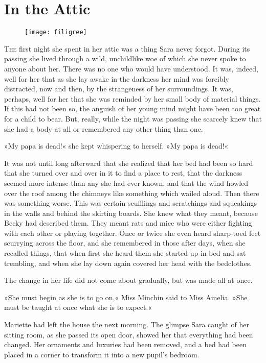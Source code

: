 \chapter{In the Attic}

\begin{figure}[t!]
\centering
\texttt{[image: filigree]}
\end{figure}

\lettrine[lines=5]{T}{he} first night she spent in her attic was a thing Sara never forgot. During its passing she lived through a wild, unchildlike woe of which she never spoke to anyone about her. There was no one who would have understood. It was, indeed, well for her that as she lay awake in the darkness her mind was forcibly distracted, now and then, by the strangeness of her surroundings. It was, perhaps, well for her that she was reminded by her small body of material things. If this had not been so, the anguish of her young mind might have been too great for a child to bear. But, really, while the night was passing she scarcely knew that she had a body at all or remembered any other thing than one.

»My papa is dead!« she kept whispering to herself. »My papa is dead!«

It was not until long afterward that she realized that her bed had been so hard that she turned over and over in it to find a place to rest, that the darkness seemed more intense than any she had ever known, and that the wind howled over the roof among the chimneys like something which wailed aloud. Then there was something worse. This was certain scufflings and scratchings and squeakings in the walls and behind the skirting boards. She knew what they meant, because Becky had described them. They meant rats and mice who were either fighting with each other or playing together. Once or twice she even heard sharp-toed feet scurrying across the floor, and she remembered in those after days, when she recalled things, that when first she heard them she started up in bed and sat trembling, and when she lay down again covered her head with the bedclothes.

The change in her life did not come about gradually, but was made all at once.

»She must begin as she is to go on,« Miss Minchin said to Miss Amelia. »She must be taught at once what she is to expect.«

Mariette had left the house the next morning. The glimpse Sara caught of her sitting room, as she passed its open door, showed her that everything had been changed. Her ornaments and luxuries had been removed, and a bed had been placed in a corner to transform it into a new pupil's bedroom.

